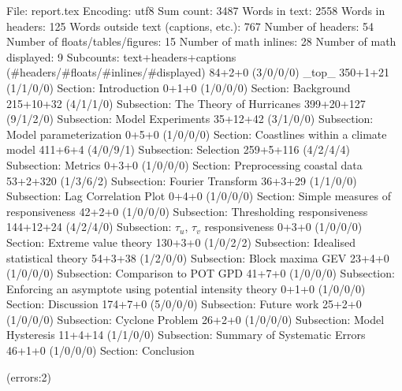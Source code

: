 
File: report.tex
Encoding: utf8
Sum count: 3487
Words in text: 2558
Words in headers: 125
Words outside text (captions, etc.): 767
Number of headers: 54
Number of floats/tables/figures: 15
Number of math inlines: 28
Number of math displayed: 9
Subcounts:
  text+headers+captions (#headers/#floats/#inlines/#displayed)
  84+2+0 (3/0/0/0) _top_
  350+1+21 (1/1/0/0) Section: Introduction
  0+1+0 (1/0/0/0) Section: Background
  215+10+32 (4/1/1/0) Subsection: The Theory of Hurricanes
  399+20+127 (9/1/2/0) Subsection: Model Experiments
  35+12+42 (3/1/0/0) Subsection: Model parameterization
  0+5+0 (1/0/0/0) Section: Coastlines within a climate model
  411+6+4 (4/0/9/1) Subsection: Selection
  259+5+116 (4/2/4/4) Subsection: Metrics
  0+3+0 (1/0/0/0) Section: Preprocessing coastal data
  53+2+320 (1/3/6/2) Subsection: Fourier Transform
  36+3+29 (1/1/0/0) Subsection: Lag Correlation Plot
  0+4+0 (1/0/0/0) Section: Simple measures of responsiveness
  42+2+0 (1/0/0/0) Subsection: Thresholding responsiveness
  144+12+24 (4/2/4/0) Subsection: $\tau_u$, $\tau_v$ responsiveness
  0+3+0 (1/0/0/0) Section: Extreme value theory
  130+3+0 (1/0/2/2) Subsection: Idealised statistical theory
  54+3+38 (1/2/0/0) Subsection: Block maxima GEV
  23+4+0 (1/0/0/0) Subsection: Comparison to POT GPD
  41+7+0 (1/0/0/0) Subsection: Enforcing an asymptote using potential intensity theory 
  0+1+0 (1/0/0/0) Section: Discussion
  174+7+0 (5/0/0/0) Subsection: Future work
  25+2+0 (1/0/0/0) Subsection: Cyclone Problem
  26+2+0 (1/0/0/0) Subsection: Model Hysteresis
  11+4+14 (1/1/0/0) Subsection: Summary of Systematic Errors
  46+1+0 (1/0/0/0) Section: Conclusion

(errors:2)
